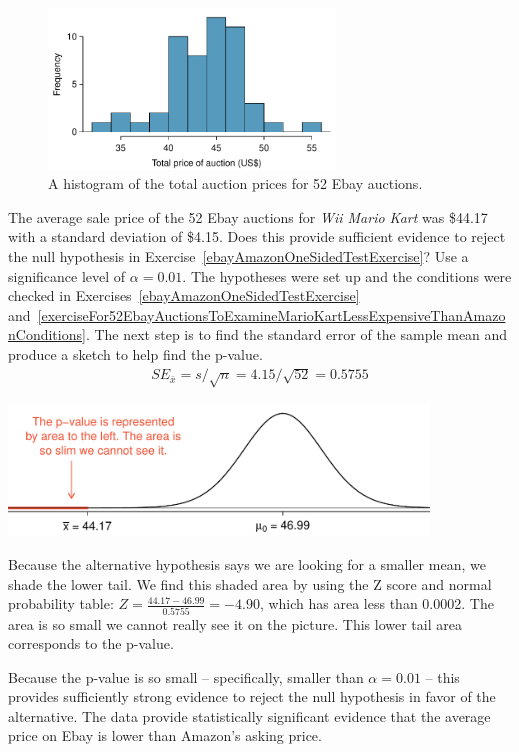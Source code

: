 \begin{figure}
   \centering
   \includegraphics[width=0.68\textwidth]{04/figures/ebayMarioKartAuctionPriceHistogramFor3ConditionsExercise/ebayMarioKartAuctionPriceHistogramFor3ConditionsExercise}
   \caption{A histogram of the total auction prices for 52 Ebay auctions.}
   \label{ebayMarioKartAuctionPriceHistogramFor3ConditionsExercise}
\end{figure}

\begin{example}{The average sale price of the 52 Ebay auctions for \emph{Wii Mario Kart} was \$44.17 with a standard deviation of \$4.15. Does this provide sufficient evidence to reject the null hypothesis in Exercise~\ref{ebayAmazonOneSidedTestExercise}? Use a significance level of $\alpha = 0.01$.}
The hypotheses were set up and the conditions were checked in Exercises~\ref{ebayAmazonOneSidedTestExercise} and~\ref{exerciseFor52EbayAuctionsToExamineMarioKartLessExpensiveThanAmazonConditions}. The next step is to find the standard error of the sample mean and produce a sketch to help find the p-value.
\begin{eqnarray*}
SE_{\bar{x}} = s/\sqrt{n} = 4.15/\sqrt{52} = 0.5755
\end{eqnarray*}
\begin{center}
\includegraphics[height=35mm]{04/figures/pVForEbayAmazonComparison/pVForEbayAmazonComparison}
\end{center}
Because the alternative hypothesis says we are looking for a smaller mean, we shade the lower tail. We find this shaded area by using the Z score and normal probability table: $Z = \frac{44.17 - 46.99}{0.5755} = -4.90$, which has area less than 0.0002. The area is so small we cannot really see it on the picture. This lower tail area corresponds to the p-value.

Because the p-value is so small -- specifically, smaller than $\alpha = 0.01$ -- this provides sufficiently strong evidence to reject the null hypothesis in favor of the alternative. The data provide statistically significant evidence that the average price on Ebay is lower than Amazon's asking price.
\end{example}

